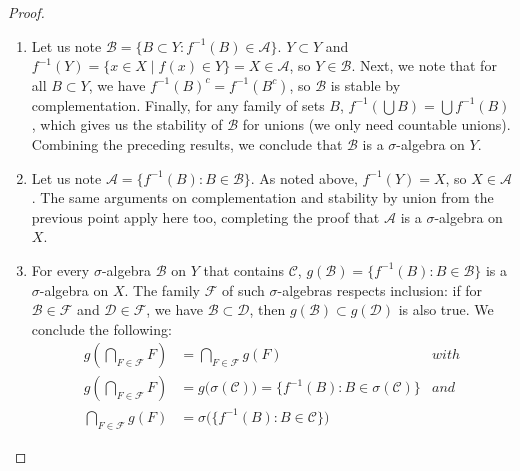 \documentclass[11pt,a4paper,twoside]{article}
\begin{document}
\begin{proof}
  \hfill
  \begin{enumerate}
  \item
    Let us note $\mathscr{B}=\{B\subset
    Y:f^{-1}(B)\in\mathscr{A}\}$. $Y\subset Y$ and $f^{-1}(Y)=\{x\in
    X\mid f(x)\in Y\} = X\in\mathscr{A}$, so $Y\in\mathscr{B}$. Next,
    we note that for all $B\subset Y$, we have
    $f^{-1}(B)^c=f^{-1}(B^c)$, so $\mathscr{B}$ is stable by
    complementation. Finally, for any family of sets $B$,
    $f^{-1}\left(\bigcup B\right)=\bigcup f^{-1}(B)$, which gives us
    the stability of $\mathscr{B}$ for unions (we only need countable
    unions). Combining the preceding results, we conclude that
    $\mathscr{B}$ is a $\sigma$-algebra on $Y$.

  \item Let us note $\mathscr{A}=\{f^{-1}(B):B\in\mathscr{B}\}$. As
    noted above, $f^{-1}(Y)=X$, so $X\in\mathscr{A}$. The same
    arguments on complementation and stability by union from the
    previous point apply here too, completing the proof that
    $\mathscr{A}$ is a $\sigma$-algebra on $X$.

  \item
    For every $\sigma$-algebra $\mathscr{B}$ on $Y$ that contains
    $\mathscr{C}$, $g(\mathscr{B})=\{f^{-1}(B):B\in\mathscr{B}\}$ is a $\sigma$-algebra
    on $X$. The family $\mathscr{F}$ of such $\sigma$-algebras respects inclusion:
    if for $\mathscr{B}\in\mathscr{F}$ and
    $\mathscr{D}\in\mathscr{F}$, we have $\mathscr{B}\subset\mathscr{D}$, then
    $g(\mathscr{B})\subset g(\mathscr{D})$ is also true. We conclude the following:
    \begin{align*}
      g\left(\bigcap_{F\in\mathscr{F}}F\right) &= \bigcap_{F\in\mathscr{F}}g(F) & with\\
      g\left(\bigcap_{F\in\mathscr{F}}F\right) &= g\big(\sigma(\mathscr{C})\big) = \{f^{-1}(B):B\in\sigma(\mathscr{C})\} & and\\
      \bigcap_{F\in\mathscr{F}}g(F) &= \sigma\big(\{f^{-1}(B):B\in\mathscr{C}\}\big)
    \end{align*}

  \end{enumerate}
\end{proof}

\end{document}
